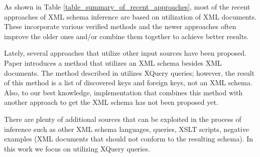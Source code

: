 As shown in Table \ref{table_summary_of_recent_approaches}, most of the recent approaches of XML schema inference are based on utilization of XML documents. These incorporate various verified methods and the newer approaches often improve the older ones and/or combine them together to achieve better results.

Lately, several approaches that utilize other input sources have been proposed. Paper \cite{Mlynkova:2009:IXS:1862681.1862693} introduces a method that utilizes an XML schema besides XML documents. The method described in \cite{Necasky:2009:DXK:1529282.1529414} utilizes XQuery queries; however, the result of this method is a list of discovered keys and foreign keys, not an XML schema. Also, to our best knowledge, implementation that combines this method with another approach to get the XML schema has not been proposed yet.

There are plenty of additional sources that can be exploited in the process of inference such as other XML schema languages, queries, XSLT scripts, negative examples (XML documents that should not conform to the resulting schema). In this work we focus on utilizing XQuery queries.
